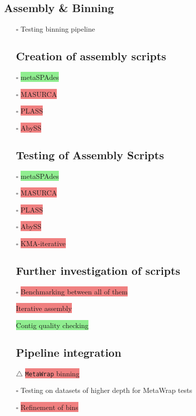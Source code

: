 \documentclass[11pt]{report}
\newcommand{\pending}{$\square$}
\newcommand{\issue}{$\triangle$}
\newcommand{\draft}{\faPencil}
\newcommand{\highlightessential}[1]{\colorbox{lightgreen}{#1}}
\newcommand{\highlightrobust}[1]{\colorbox{lightcoral}{#1}}
\begin{document}
\begin{multicols}{2}
		\section*{Assembly \& Binning}
		\begin{itemize}
			\item [\pending] Testing binning pipeline
			
\subsection*{Creation of assembly scripts}

\item  [\pending] \highlightessential{metaSPAdes}
\item [\pending] \highlightrobust{MASURCA}
\item [\pending] \highlightrobust{PLASS}
\item [\pending] \highlightrobust{AbySS}

\subsection*{ Testing of Assembly Scripts}

\item  [\pending] \highlightessential{metaSPAdes}
\item [\pending] \highlightrobust{MASURCA}
\item [\pending] \highlightrobust{PLASS}
\item [\pending] \highlightrobust{AbySS}
\item [\pending] \highlightrobust{KMA-iterative}
\subsection*{Further investigation of scripts}
\item [\pending] \highlightrobust{Benchmarking between all of them}
\item [\draft] \highlightrobust{Iterative assembly}
\item [\draft] \highlightessential{Contig quality checking}
\subsection*{Pipeline integration}
\item [\issue] \highlightrobust{\texttt{MetaWrap} binning}
\item [\pending] Testing on datasets of higher depth for MetaWrap tests
\item [\pending] \highlightrobust{Refinement of bins}
		\end{itemize}
		

\end{multicols}
\end{document}
